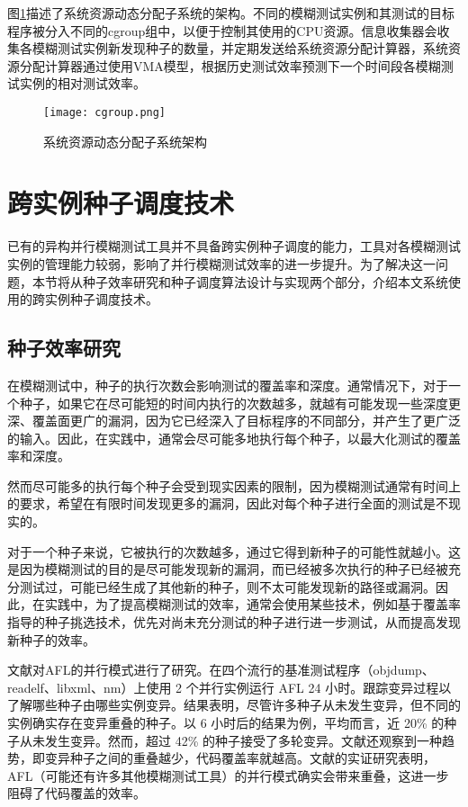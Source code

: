 \documentclass[master]{thesis-uestc}
\begin{document}
图\ref{cgroup}描述了系统资源动态分配子系统的架构。不同的模糊测试实例和其测试的目标程序被分入不同的cgroup组中，以便于控制其使用的CPU资源。信息收集器会收集各模糊测试实例新发现种子的数量，并定期发送给系统资源分配计算器，系统资源分配计算器通过使用VMA模型，根据历史测试效率预测下一个时间段各模糊测试实例的相对测试效率。

\begin{figure}[!htbp]
    \vspace{6pt}
    \centering
    \texttt{[image: cgroup.png]}
    \caption{系统资源动态分配子系统架构}
    \label{cgroup}
\end{figure}

\section{跨实例种子调度技术}
已有的异构并行模糊测试工具并不具备跨实例种子调度的能力，工具对各模糊测试实例的管理能力较弱，影响了并行模糊测试效率的进一步提升。为了解决这一问题，本节将从种子效率研究和种子调度算法设计与实现两个部分，介绍本文系统使用的跨实例种子调度技术。
\subsection{种子效率研究}

在模糊测试中，种子的执行次数会影响测试的覆盖率和深度。通常情况下，对于一个种子，如果它在尽可能短的时间内执行的次数越多，就越有可能发现一些深度更深、覆盖面更广的漏洞，因为它已经深入了目标程序的不同部分，并产生了更广泛的输入。因此，在实践中，通常会尽可能多地执行每个种子，以最大化测试的覆盖率和深度。

然而尽可能多的执行每个种子会受到现实因素的限制，因为模糊测试通常有时间上的要求，希望在有限时间发现更多的漏洞，因此对每个种子进行全面的测试是不现实的。

对于一个种子来说，它被执行的次数越多，通过它得到新种子的可能性就越小。这是因为模糊测试的目的是尽可能发现新的漏洞，而已经被多次执行的种子已经被充分测试过，可能已经生成了其他新的种子，则不太可能发现新的路径或漏洞。因此，在实践中，为了提高模糊测试的效率，通常会使用某些技术，例如基于覆盖率指导的种子挑选技术，优先对尚未充分测试的种子进行进一步测试，从而提高发现新种子的效率。

文献\cite{wang2021facilitating}对AFL的并行模式进行了研究。在四个流行的基准测试程序（objdump、readelf、libxml、nm）上使用 2 个并行实例运行 AFL 24 小时。跟踪变异过程以了解哪些种子由哪些实例变异。结果表明，尽管许多种子从未发生变异，但不同的实例确实存在变异重叠的种子。以 6 小时后的结果为例，平均而言，近 20\% 的种子从未发生变异。然而，超过 42\% 的种子接受了多轮变异。文献\cite{wang2021facilitating}还观察到一种趋势，即变异种子之间的重叠越少，代码覆盖率就越高。文献\cite{wang2021facilitating}的实证研究表明，AFL（可能还有许多其他模糊测试工具）的并行模式确实会带来重叠，这进一步阻碍了代码覆盖的效率。
\end{document}
